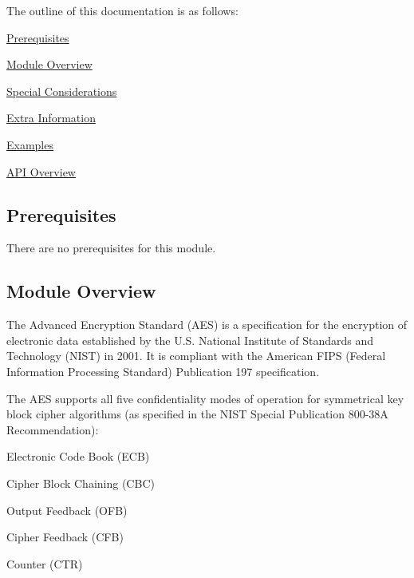 The outline of this documentation is as follows\+:
\begin{DoxyItemize}
\item \hyperlink{group__asfdoc__sam0__drivers__aes__group_asfdoc_sam0_drivers_aes_prerequisites}{Prerequisites}
\item \hyperlink{group__asfdoc__sam0__drivers__aes__group_asfdoc_sam0_drivers_aes_module_overview}{Module Overview}
\item \hyperlink{group__asfdoc__sam0__drivers__aes__group_asfdoc_sam0_drivers_aes_special_considerations}{Special Considerations}
\item \hyperlink{group__asfdoc__sam0__drivers__aes__group_asfdoc_sam0_drivers_aes_extra_info}{Extra Information}
\item \hyperlink{group__asfdoc__sam0__drivers__aes__group_asfdoc_sam0_drivers_aes_examples}{Examples}
\item \hyperlink{group__asfdoc__sam0__drivers__aes__group_asfdoc_sam0_drivers_aes_api_overview}{A\+P\+I Overview}
\end{DoxyItemize}\hypertarget{group__asfdoc__sam0__drivers__aes__group_asfdoc_sam0_drivers_aes_prerequisites}{}\subsection{Prerequisites}\label{group__asfdoc__sam0__drivers__aes__group_asfdoc_sam0_drivers_aes_prerequisites}
There are no prerequisites for this module.\hypertarget{group__asfdoc__sam0__drivers__aes__group_asfdoc_sam0_drivers_aes_module_overview}{}\subsection{Module Overview}\label{group__asfdoc__sam0__drivers__aes__group_asfdoc_sam0_drivers_aes_module_overview}
The Advanced Encryption Standard (A\+E\+S) is a specification for the encryption of electronic data established by the U.\+S. National Institute of Standards and Technology (N\+I\+S\+T) in 2001. It is compliant with the American F\+I\+P\+S (Federal Information Processing Standard) Publication 197 specification.

The A\+E\+S supports all five confidentiality modes of operation for symmetrical key block cipher algorithms (as specified in the N\+I\+S\+T Special Publication 800-\/38\+A Recommendation)\+:
\begin{DoxyItemize}
\item Electronic Code Book (E\+C\+B)
\item Cipher Block Chaining (C\+B\+C)
\item Output Feedback (O\+F\+B)
\item Cipher Feedback (C\+F\+B)
\item Counter (C\+T\+R)
\end{DoxyItemize}

